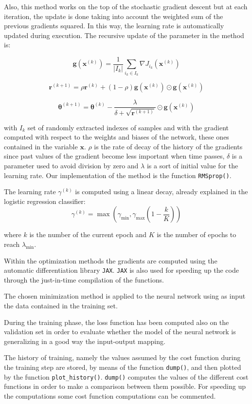 \documentclass{Configuration_Files/PoliMi3i_thesis}
\begin{document}
\begin{enumerate}
    Also, this method works on the top of the stochastic gradient descent but at each iteration, the update is done taking into account the weighted sum of the previous gradients squared. In this way, the learning rate is automatically updated during execution.
    The recursive update of the parameter in the method is:

    $$\mathbf{g}(\mathbf{x}^{(k)})=\frac{1}{|I_{k}|}\sum_{i_k \in I_k}{\nabla J_{i_{k}}(\mathbf{x}^{(k)})}$$
    
    $$\mathbf{r}^{(k+1)} = \rho \mathbf{r}^{(k)} + (1 - \rho) \mathbf{g}(\mathbf{x}^{(k)}) \odot \mathbf{g}(\mathbf{x}^{(k)})$$
    
    $$\boldsymbol{\theta}^{(k+1)} = \boldsymbol{\theta}^{(k)} - \frac{\lambda}{\delta + \sqrt{\mathbf{r}^{(k+1)}}} \odot \mathbf{g}(\mathbf{x}^{(k)})$$
    
    with $I_{k}$ set of randomly extracted indexes of samples and with the gradient computed with respect to the weights and biases of the network, these ones contained in the variable $\mathbf{x}$. $\rho$ is the rate of decay of the history of the gradients since past values of the gradient become less important when time passes, $\delta$ is a parameter used to avoid division by zero and $\lambda$ is a sort of initial value for the learning rate.
    Our implementation of the method is the function \verb|RMSprop()|.
\end{enumerate}

The learning rate $\gamma^{(k)}$ is computed using a linear decay, already explained in the logistic regression classifier:
$$\gamma^{(k)} = \max\left(\gamma_{\min}, \gamma_{\max} (1 - \frac{k}{K})\right)$$

where $k$ is the number of the current epoch and $K$ is the number of epochs to reach $\lambda_{\min}$.

Within the optimization methods the gradients are computed using the automatic differentiation library \verb|JAX|. \verb|JAX| is also used for speeding up the code through the just-in-time compilation of the functions.

The chosen minimization method is applied to the neural network using as input the data contained in the training set.

During the training phase, the loss function has been computed also on the validation set in order to evaluate whether the model of the neural network is generalizing in a good way the input-output mapping.

The history of training, namely the values assumed by the cost function during the training step are stored, by means of the function \verb|dump()|, and then plotted by the function \verb|plot_history()|. \verb|dump()| computes the values of the different cost functions in order to make a comparison between them possible. For speeding up the computations some cost function computations can be commented.
\end{document}
